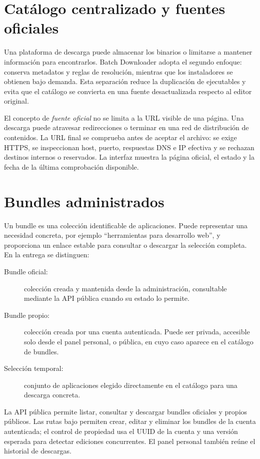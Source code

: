 
\section{Catálogo centralizado y fuentes oficiales}

Una plataforma de descarga puede almacenar los binarios o limitarse a mantener información para encontrarlos. Batch Downloader adopta el segundo enfoque: conserva metadatos y reglas de resolución, mientras que los instaladores se obtienen bajo demanda. Esta separación reduce la duplicación de ejecutables y evita que el catálogo se convierta en una fuente desactualizada respecto al editor original.

El concepto de \emph{fuente oficial} no se limita a la URL visible de una página. Una descarga puede atravesar redirecciones o terminar en una red de distribución de contenidos. La URL final se comprueba antes de aceptar el archivo: se exige HTTPS, se inspeccionan host, puerto, respuestas DNS e IP efectiva y se rechazan destinos internos o reservados. La interfaz muestra la página oficial, el estado y la fecha de la última comprobación disponible.

\section{Bundles administrados}

Un bundle es una colección identificable de aplicaciones. Puede representar una necesidad concreta, por ejemplo ``herramientas para desarrollo web'', y proporciona un enlace estable para consultar o descargar la selección completa. En la entrega se distinguen:

\begin{description}
	\item[Bundle oficial:] colección creada y mantenida desde la administración, consultable mediante la API pública cuando su estado lo permite.
	\item[Bundle propio:] colección creada por una cuenta autenticada. Puede ser privada, accesible solo desde el panel personal, o pública, en cuyo caso aparece en el catálogo de bundles.
	\item[Selección temporal:] conjunto de aplicaciones elegido directamente en el catálogo para una descarga concreta.
\end{description}

La API pública permite listar, consultar y descargar bundles oficiales y propios públicos. Las rutas bajo  permiten crear, editar y eliminar los bundles de la cuenta autenticada; el control de propiedad usa el UUID de la cuenta y una versión esperada para detectar ediciones concurrentes. El panel personal también reúne el historial de descargas.

